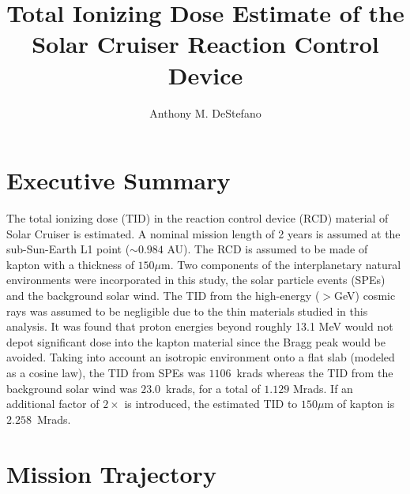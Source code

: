 \documentclass{hitec}
\title{Total Ionizing Dose Estimate of the Solar Cruiser Reaction Control Device}
\author{Anthony M. DeStefano}
\begin{document}
\maketitle
{}

\tableofcontents
\listoffigures
\listoftables
\lstlistoflistings
\newpage






\cleardoublepage
{}
\section{Executive Summary}

The total ionizing dose (TID) in the reaction control device (RCD) material of Solar Cruiser is estimated. A nominal mission length of 2 years is assumed at the sub-Sun-Earth L1 point ($\sim 0.984$ AU). The RCD is assumed to be made of kapton with a thickness of $150\mu$m. Two components of the interplanetary natural environments were incorporated in this study, the solar particle events (SPEs) and the background solar wind. The TID from the high-energy ($>$GeV) cosmic rays was assumed to be negligible due to the thin materials studied in this analysis. It was found that proton energies beyond roughly 13.1 MeV would not depot significant dose into the kapton material since the Bragg peak would be avoided. Taking into account an isotropic environment onto a flat slab (modeled as a cosine law), the TID from SPEs was $1106$~krads whereas the TID from the background solar wind was $23.0$~krads, for a total of $1.129$ Mrads. If an additional factor of $2\times$ is introduced, the estimated TID to $150\mu$m of kapton is $2.258$~Mrads.



\newpage
\section{Mission Trajectory}
\end{document}

